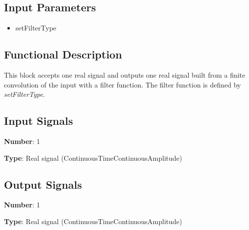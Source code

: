 \documentclass[../../sdf/tex/BPSK_system.tex]{subfiles}
\date{}
\begin{document}
\onlyinsubfile{\maketitle}

\subsection*{Input Parameters}

\begin{multicols}{2}
	\begin{itemize}
		\item setFilterType
	\end{itemize}
\end{multicols}

\subsection*{Functional Description}

This block accepts one real signal and outputs one real signal built from a finite convolution of the input with a filter function. The filter function is defined by \textit{setFilterType}.


\subsection*{Input Signals}

\textbf{Number}: 1

\textbf{Type}: Real signal (ContinuousTimeContinuousAmplitude)

\subsection*{Output Signals}

\textbf{Number}: 1

\textbf{Type}: Real signal (ContinuousTimeContinuousAmplitude)
\end{document}
